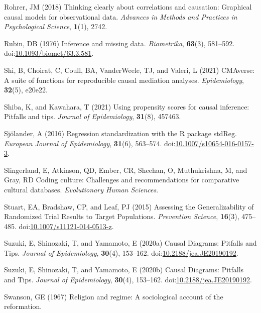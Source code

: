 \documentclass[
  singlecolumn,
  9pt]{article}
\begin{document}
\begin{CSLReferences}
Rohrer, JM (2018) Thinking clearly about correlations and causation:
Graphical causal models for observational data. \emph{Advances in
Methods and Practices in Psychological Science}, \textbf{1}(1), 2742.

Rubin, DB (1976) Inference and missing data. \emph{Biometrika},
\textbf{63}(3), 581--592.
doi:\href{https://doi.org/10.1093/biomet/63.3.581}{10.1093/biomet/63.3.581}.

Shi, B, Choirat, C, Coull, BA, VanderWeele, TJ, and Valeri, L (2021)
CMAverse: A suite of functions for reproducible causal mediation
analyses. \emph{Epidemiology}, \textbf{32}(5), e20e22.

Shiba, K, and Kawahara, T (2021) Using propensity scores for causal
inference: Pitfalls and tips. \emph{Journal of Epidemiology},
\textbf{31}(8), 457463.

Sjölander, A (2016) Regression standardization with the R package
stdReg. \emph{European Journal of Epidemiology}, \textbf{31}(6),
563--574.
doi:\href{https://doi.org/10.1007/s10654-016-0157-3}{10.1007/s10654-016-0157-3}.

Slingerland, E, Atkinson, QD, Ember, CR, Sheehan, O, Muthukrishna, M,
and Gray, RD Coding culture: Challenges and recommendations for
comparative cultural databases. \emph{Evolutionary Human Sciences}.

Stuart, EA, Bradshaw, CP, and Leaf, PJ (2015) Assessing the
Generalizability of Randomized Trial Results to Target Populations.
\emph{Prevention Science}, \textbf{16}(3), 475--485.
doi:\href{https://doi.org/10.1007/s11121-014-0513-z}{10.1007/s11121-014-0513-z}.

Suzuki, E, Shinozaki, T, and Yamamoto, E (2020a) Causal Diagrams:
Pitfalls and Tips. \emph{Journal of Epidemiology}, \textbf{30}(4),
153--162.
doi:\href{https://doi.org/10.2188/jea.JE20190192}{10.2188/jea.JE20190192}.

Suzuki, E, Shinozaki, T, and Yamamoto, E (2020b) Causal Diagrams:
Pitfalls and Tips. \emph{Journal of Epidemiology}, \textbf{30}(4),
153--162.
doi:\href{https://doi.org/10.2188/jea.JE20190192}{10.2188/jea.JE20190192}.

Swanson, GE (1967) Religion and regime: A sociological account of the
reformation.


\end{CSLReferences}
\end{document}
